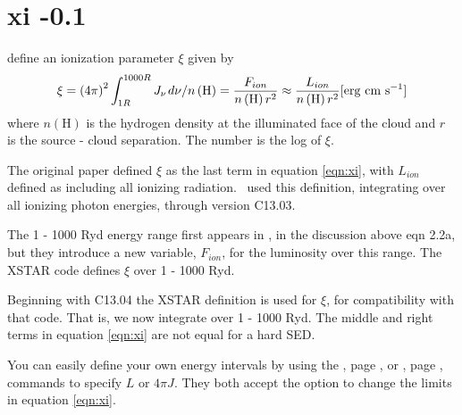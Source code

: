\section{xi -0.1 }

\citet{Tarter1969, Krolik1981, 2001ApJS..133..221K} define an ionization parameter
$\xi$ given by
\begin{equation}
\xi  =  \left( {4\pi
} \right)^2 \int_{1R}^{1000R}  J_\nu  {\kern 1pt} d\nu /n\left( {\mathrm{H}}
\right)
= \frac{{F_{ion} }}{{n\left( {\mathrm{H}} \right)r^2 }}
\approx \frac{{L_{ion} }}{{n\left( {\mathrm{H}} \right)r^2 }}
 [\mathrm{erg\ cm\ s}^{-1}]
 \label{eqn:xi}
\end{equation}
where $n(\mathrm{H})$ is the hydrogen density at the illuminated face
of the cloud and $r$ is the source - cloud separation.
The number is the log of $\xi$.

The original \citet{Tarter1969} paper defined $\xi$ as the last term in equation \ref{eqn:xi}, 
with $L_{ion}$ defined as including all ionizing radiation.  
\Cloudy\ used this definition, integrating over all ionizing photon energies,
through version C13.03.  

The 1 - 1000 Ryd  energy range first appears in \citet{Krolik1981}, 
in the discussion above eqn 2.2a, 
but they introduce a new variable, $F_{ion}$, for the luminosity over this range.
The XSTAR code \citep{2001ApJS..133..221K} defines  $\xi$ over 1 - 1000 Ryd.

Beginning with C13.04 the XSTAR definition is used for $\xi$,
for compatibility with that code.
That is, we now integrate over 1 - 1000 Ryd.
The middle and right terms in equation \ref{eqn:xi} are not equal for a hard SED.

You can easily define your own energy intervals by using the ,
page \pageref{sec:LuminosityCommand},
or , page \pageref{sec:IntensityCommand}, commands to specify $L$ or $4\pi J$.
They both accept the  option to change the limits in equation \ref{eqn:xi}.

